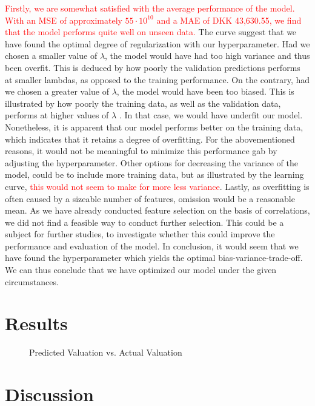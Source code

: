 \documentclass[12pt,a4paper]{article}
\begin{document}
\textcolor{red}{Firstly, we are somewhat satisfied with the average performance of the model. With an MSE of approximately $55\cdot10^{10}$ and a MAE of DKK 43,630.55, we find that the model performs quite well on unseen data.} 
The curve suggest that we have found the optimal degree of regularization with our hyperparameter. Had we chosen a smaller value of $\lambda$, the model would have had too high variance and thus been overfit. This is deduced by how poorly the validation predictions performs at smaller lambdas, as opposed to the training performance. On the contrary, had we chosen a greater value of $\lambda$, the model would have been too biased. This is illustrated by how poorly the training data, as well as the validation data, performs at higher values of $\lambda$ . In that case, we would have underfit our model. 
Nonetheless, it is apparent that our model performs better on the training data, which indicates that it retains a degree of overfitting. For the abovementioned reasons, it would not be meaningful to minimize this performance gab by adjusting the hyperparameter. Other options for decreasing the variance of the model, could be to include more training data, but as illustrated by the learning curve, \textcolor{red}{this would not seem to make for more less variance}. Lastly, as overfitting is often caused by a sizeable number of features, omission would be a reasonable mean. As we have already conducted feature selection on the basis of correlations, we did not find a feasible way to conduct further selection. This could be a subject for further studies, to investigate whether this could improve the performance and evaluation of the model. \newline
In conclusion, it would seem that we have found the hyperparameter which yields the optimal bias-variance-trade-off. We can thus conclude that we have optimized our model under the given circumstances. 




\section{Results}
\begin{figure}[H]
\centering
\caption{Predicted Valuation vs. Actual Valuation}
\end{figure}


\section{Discussion}
\end{document}
